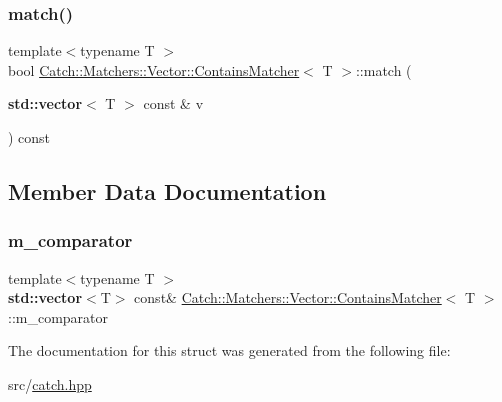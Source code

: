 \mbox{\label{struct_catch_1_1_matchers_1_1_vector_1_1_contains_matcher_aba81516816a6796124dd4fe4843e7284}} 
\subsubsection{\texorpdfstring{match()}{match()}}
{\footnotesize\ttfamily template$<$typename T $>$ \\
bool \hyperlink{struct_catch_1_1_matchers_1_1_vector_1_1_contains_matcher}{Catch\+::\+Matchers\+::\+Vector\+::\+Contains\+Matcher}$<$ T $>$\+::match (\begin{DoxyParamCaption}\item[{\textbf{ std\+::vector}$<$ T $>$ const \&}]{v }\end{DoxyParamCaption}) const\hspace{0.3cm}{\ttfamily [inline]}}



\subsection{Member Data Documentation}
\mbox{\label{struct_catch_1_1_matchers_1_1_vector_1_1_contains_matcher_a83d051166e4ed0d535219ad6ee99abb2}} 
\subsubsection{\texorpdfstring{m\+\_\+comparator}{m\_comparator}}
{\footnotesize\ttfamily template$<$typename T $>$ \\
\textbf{ std\+::vector}$<$T$>$ const\& \hyperlink{struct_catch_1_1_matchers_1_1_vector_1_1_contains_matcher}{Catch\+::\+Matchers\+::\+Vector\+::\+Contains\+Matcher}$<$ T $>$\+::m\+\_\+comparator}



The documentation for this struct was generated from the following file\+:\begin{DoxyCompactItemize}
\item 
src/\hyperlink{catch_8hpp}{catch.\+hpp}\end{DoxyCompactItemize}
